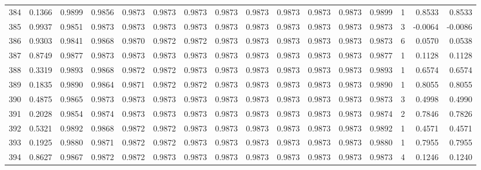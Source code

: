 \begin{tabular}{lrrrrrrrrrrrrrrr}
384 &      0.1366 &  0.9899 &  0.9856 &  0.9873 &  0.9873 &  0.9873 &  0.9873 &  0.9873 &  0.9873 &  0.9873 &   0.9873 &     0.9899 &      1 &                    0.8533 &                     0.8533 \\
385 &      0.9937 &  0.9851 &  0.9873 &  0.9873 &  0.9873 &  0.9873 &  0.9873 &  0.9873 &  0.9873 &  0.9873 &   0.9873 &     0.9873 &      3 &                   -0.0064 &                    -0.0086 \\
386 &      0.9303 &  0.9841 &  0.9868 &  0.9870 &  0.9872 &  0.9872 &  0.9873 &  0.9873 &  0.9873 &  0.9873 &   0.9873 &     0.9873 &      6 &                    0.0570 &                     0.0538 \\
387 &      0.8749 &  0.9877 &  0.9873 &  0.9873 &  0.9873 &  0.9873 &  0.9873 &  0.9873 &  0.9873 &  0.9873 &   0.9873 &     0.9877 &      1 &                    0.1128 &                     0.1128 \\
388 &      0.3319 &  0.9893 &  0.9868 &  0.9872 &  0.9872 &  0.9873 &  0.9873 &  0.9873 &  0.9873 &  0.9873 &   0.9873 &     0.9893 &      1 &                    0.6574 &                     0.6574 \\
389 &      0.1835 &  0.9890 &  0.9864 &  0.9871 &  0.9872 &  0.9872 &  0.9873 &  0.9873 &  0.9873 &  0.9873 &   0.9873 &     0.9890 &      1 &                    0.8055 &                     0.8055 \\
390 &      0.4875 &  0.9865 &  0.9873 &  0.9873 &  0.9873 &  0.9873 &  0.9873 &  0.9873 &  0.9873 &  0.9873 &   0.9873 &     0.9873 &      3 &                    0.4998 &                     0.4990 \\
391 &      0.2028 &  0.9854 &  0.9874 &  0.9873 &  0.9873 &  0.9873 &  0.9873 &  0.9873 &  0.9873 &  0.9873 &   0.9873 &     0.9874 &      2 &                    0.7846 &                     0.7826 \\
392 &      0.5321 &  0.9892 &  0.9868 &  0.9872 &  0.9872 &  0.9873 &  0.9873 &  0.9873 &  0.9873 &  0.9873 &   0.9873 &     0.9892 &      1 &                    0.4571 &                     0.4571 \\
393 &      0.1925 &  0.9880 &  0.9871 &  0.9872 &  0.9872 &  0.9873 &  0.9873 &  0.9873 &  0.9873 &  0.9873 &   0.9873 &     0.9880 &      1 &                    0.7955 &                     0.7955 \\
394 &      0.8627 &  0.9867 &  0.9872 &  0.9872 &  0.9873 &  0.9873 &  0.9873 &  0.9873 &  0.9873 &  0.9873 &   0.9873 &     0.9873 &      4 &                    0.1246 &                     0.1240 \\

\end{tabular}
